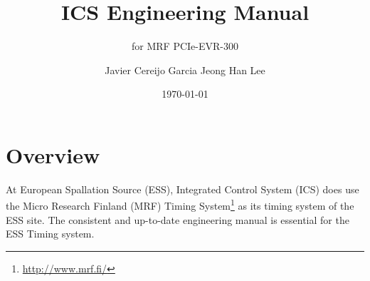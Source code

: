 \documentclass[11pt
  , a4paper
  , article
  , oneside
  , showtrims
]{memoir}
\begin{document}


\date{\today}




\title{ICS Engineering Manual}
\subtitle{for MRF PCIe-EVR-300}
\author{Javier Cereijo Garcia \newline Jeong Han Lee }

\reviewer{}


\showtrimson

\esstitle
\newpage
\tableofcontents
\newpage



\chapter{Overview}
At European Spallation Source (ESS), Integrated Control System (ICS) does use the Micro Research Finland (MRF) Timing System{\footnote{\url{http://www.mrf.fi/}}} as its timing system of the ESS site. The consistent and up-to-date engineering manual is essential for the ESS Timing system.
\end{document}
